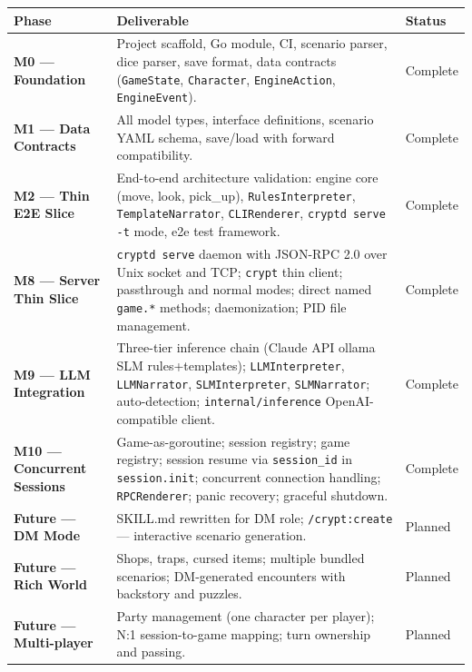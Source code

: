 \documentclass[a4paper,10pt]{article}
\newcommand{\cmd}[1]{\texttt{#1}}
\newcommand{\field}[1]{\texttt{#1}}
\newcommand{\pkg}[1]{\texttt{#1}}
\begin{document}
\begin{center}
\small
\begin{tabular}{lp{7.5cm}l}
\toprule
\textbf{Phase} & \textbf{Deliverable} & \textbf{Status} \\
\midrule
\textbf{M0 — Foundation}
  & Project scaffold, Go module, CI, scenario parser, dice parser,
    save format, data contracts (\texttt{GameState}, \texttt{Character},
    \texttt{EngineAction}, \texttt{EngineEvent}).
  & Complete \\
\midrule
\textbf{M1 — Data Contracts}
  & All model types, interface definitions, scenario YAML schema,
    save/load with forward compatibility.
  & Complete \\
\midrule
\textbf{M2 — Thin E2E Slice}
  & End-to-end architecture validation: engine core (move, look,
    pick\_up), \texttt{RulesInterpreter}, \texttt{TemplateNarrator},
    \texttt{CLIRenderer}, \cmd{cryptd serve -t} mode, e2e test
    framework.
  & Complete \\
\midrule
\textbf{M8 — Server Thin Slice}
  & \cmd{cryptd serve} daemon with JSON-RPC 2.0 over Unix socket
    and TCP; \cmd{crypt} thin client; passthrough and normal modes;
    direct named \texttt{game.*} methods; daemonization; PID file
    management.
  & Complete \\
\midrule
\textbf{M9 — LLM Integration}
  & Three-tier inference chain (Claude API \textrightarrow{} ollama SLM \textrightarrow{}
    rules+templates); \texttt{LLMInterpreter}, \texttt{LLMNarrator},
    \texttt{SLMInterpreter}, \texttt{SLMNarrator}; auto-detection;
    \pkg{internal/inference} OpenAI-compatible client.
  & Complete \\
\midrule
\textbf{M10 — Concurrent Sessions}
  & Game-as-goroutine; session registry; game registry; session
    resume via \field{session\_id} in \texttt{session.init}; concurrent
    connection handling; \texttt{RPCRenderer}; panic recovery;
    graceful shutdown.
  & Complete \\
\midrule
\textbf{Future — DM Mode}
  & SKILL.md rewritten for DM role;
    \cmd{/crypt:create} --- interactive scenario generation.
  & Planned \\
\midrule
\textbf{Future — Rich World}
  & Shops, traps, cursed items; multiple bundled scenarios;
    DM-generated encounters with backstory and puzzles.
  & Planned \\
\midrule
\textbf{Future — Multi-player}
  & Party management (one character per player);
    N:1 session-to-game mapping;
    turn ownership and passing.
  & Planned \\
\bottomrule
\end{tabular}
\end{center}
\end{document}
